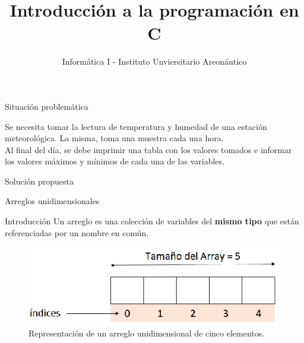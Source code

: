 \documentclass[xcolor=pdftex,table,11pt]{beamer}
\author{Informática I - Instituto Unviersitario Areonáutico}
\title{Introducción a la programación en C}
\begin{document}
\begin{frame}
\titlepage
\end{frame}





\begin{frame}{Situación problemática}

\begin{block}{}
Se necesita tomar la lectura de temperatura y humedad de una estación meteorológica. La misma, toma una muestra cada una hora. \\
Al final del día, se debe imprimir una tabla con los valores tomados e informar los valores máximos y mínimos de cada una de las variables.
\end{block}
\end{frame}

\begin{frame}{Solución propuesta}


\codesetstylefrombeamer
{}

\end{frame}

\begin{frame}{Arreglos unidimensionales}
\begin{block}{Introducción}
Un arreglo es una colección de variables del \textbf{mismo tipo} que están referenciadas por un nombre en común. 
\end{block}

\begin{figure}
 \centering
\includegraphics[scale=0.5]{../img/exported/arrays.png}
\caption{Representación de un arreglo unidimensional de cinco elementos.}
\end{figure}
\end{frame}
\end{document}
